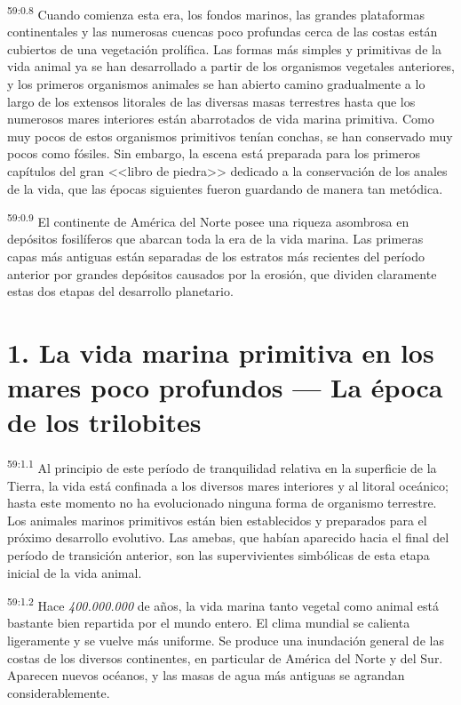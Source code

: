 \par
\textsuperscript{59:0.8} Cuando comienza esta era, los fondos marinos, las grandes plataformas continentales y las numerosas cuencas poco profundas cerca de las costas están cubiertos de una vegetación prolífica. Las formas más simples y primitivas de la vida animal ya se han desarrollado a partir de los organismos vegetales anteriores, y los primeros organismos animales se han abierto camino gradualmente a lo largo de los extensos litorales de las diversas masas terrestres hasta que los numerosos mares interiores están abarrotados de vida marina primitiva. Como muy pocos de estos organismos primitivos tenían conchas, se han conservado muy pocos como fósiles. Sin embargo, la escena está preparada para los primeros capítulos del gran <<libro de piedra>> dedicado a la conservación de los anales de la vida, que las épocas siguientes fueron guardando de manera tan metódica.

\par
\textsuperscript{59:0.9} El continente de América del Norte posee una riqueza asombrosa en depósitos fosilíferos que abarcan toda la era de la vida marina. Las primeras capas más antiguas están separadas de los estratos más recientes del período anterior por grandes depósitos causados por la erosión, que dividen claramente estas dos etapas del desarrollo planetario.

\section*{1. La vida marina primitiva en los mares poco profundos --- La época de los trilobites}
\par
\textsuperscript{59:1.1} Al principio de este período de tranquilidad relativa en la superficie de la Tierra, la vida está confinada a los diversos mares interiores y al litoral oceánico; hasta este momento no ha evolucionado ninguna forma de organismo terrestre. Los animales marinos primitivos están bien establecidos y preparados para el próximo desarrollo evolutivo. Las amebas, que habían aparecido hacia el final del período de transición anterior, son las supervivientes simbólicas de esta etapa inicial de la vida animal.

\par
\textsuperscript{59:1.2} Hace \textit{400.000.000} de años, la vida marina tanto vegetal como animal está bastante bien repartida por el mundo entero. El clima mundial se calienta ligeramente y se vuelve más uniforme. Se produce una inundación general de las costas de los diversos continentes, en particular de América del Norte y del Sur. Aparecen nuevos océanos, y las masas de agua más antiguas se agrandan considerablemente.

